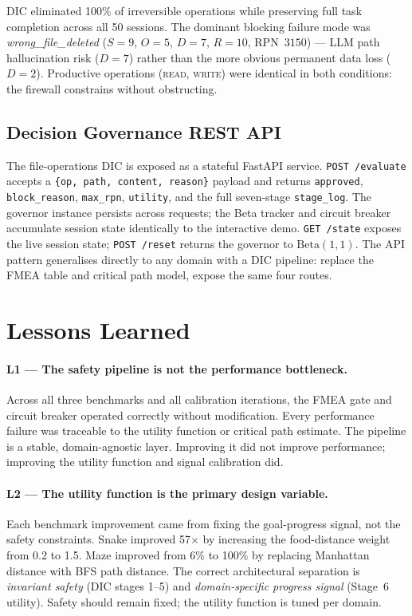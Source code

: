 \documentclass[11pt,letterpaper]{article}
\begin{document}
DIC eliminated 100\% of irreversible operations while preserving full task
completion across all 50 sessions.
The dominant blocking failure mode was \textit{wrong\_file\_deleted}
($S{=}9$, $O{=}5$, $D{=}7$, $R{=}10$, RPN~$3150$) — LLM path hallucination
risk ($D{=}7$) rather than the more obvious permanent data loss ($D{=}2$).
Productive operations (\textsc{read}, \textsc{write}) were identical in both
conditions: the firewall constrains without obstructing.

\subsection{Decision Governance REST API}

The file-operations DIC is exposed as a stateful FastAPI service.
\texttt{POST /evaluate} accepts a \texttt{\{op, path, content, reason\}} payload
and returns \texttt{approved}, \texttt{block\_reason}, \texttt{max\_rpn},
\texttt{utility}, and the full seven-stage \texttt{stage\_log}.
The governor instance persists across requests; the Beta tracker and circuit
breaker accumulate session state identically to the interactive demo.
\texttt{GET /state} exposes the live session state; \texttt{POST /reset} returns
the governor to $\mathrm{Beta}(1,1)$.
The API pattern generalises directly to any domain with a DIC pipeline: replace
the FMEA table and critical path model, expose the same four routes.

\section{Lessons Learned}
\label{sec:lessons}

\paragraph{L1 --- The safety pipeline is not the performance bottleneck.}
Across all three benchmarks and all calibration iterations, the FMEA gate and
circuit breaker operated correctly without modification. Every performance failure
was traceable to the utility function or critical path estimate. The pipeline is
a stable, domain-agnostic layer. Improving it did not improve performance;
improving the utility function and signal calibration did.

\paragraph{L2 --- The utility function is the primary design variable.}
Each benchmark improvement came from fixing the goal-progress signal, not the
safety constraints. Snake improved 57$\times$ by increasing the food-distance
weight from 0.2 to 1.5. Maze improved from 6\% to 100\% by replacing Manhattan
distance with BFS path distance. The correct architectural separation is
\textit{invariant safety} (DIC stages 1--5) and \textit{domain-specific progress
signal} (Stage~6 utility). Safety should remain fixed; the utility function is
tuned per domain.
\end{document}
